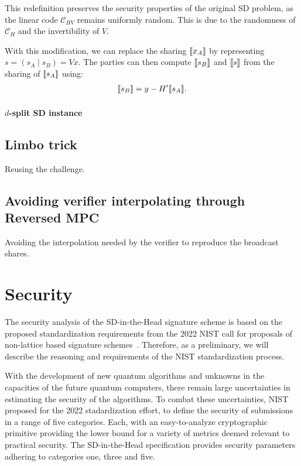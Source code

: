 \documentclass[11pt]{report}
\theoremstyle{definition}
\theoremstyle{plain}
\begin{document}
This redefinition preserves the security properties of the original SD problem, as the linear code $\mathcal{C}_{HV}$ remains uniformly random. This is due to the randomness of $\mathcal{C}_H$ and the invertibility of $V$.

With this modification, we can replace the sharing $\llbracket x_A \rrbracket$ by representing $s = (s_A \mid s_B) = Vx$. The parties can then compute $\llbracket s_B \rrbracket$ and $\llbracket s \rrbracket$ from the sharing of $\llbracket s_A \rrbracket$ using:
\begin{align*}
  \llbracket s_B \rrbracket = y - H'\llbracket s_A \rrbracket.
\end{align*}

\paragraph{$d$-split SD instance}

\subsection{Limbo trick}

Reusing the challenge.

\subsection{Avoiding verifier interpolating through Reversed MPC}

Avoiding the interpolation needed by the verifier to reproduce the broadcast shares.

\section{Security}

The security analysis of the SD-in-the-Head signature scheme is based on the proposed standardization requirements from the 2022 NIST call for proposals of non-lattice based signature schemes~\cite{nistcall}. Therefore, as a preliminary, we will describe the reasoning and requirements of the NIST standardization process.

With the development of new quantum algorithms and unknowns in the capacities of the future quantum computers, there remain large uncertainties in estimating the security of the algorithms. To combat these uncertainties, NIST proposed for the 2022 stadardization effort, to define the security of submissions in a range of five categories. Each, with an easy-to-analyze cryptographic primitive providing the lower bound for a variety of metrics deemed relevant to practical security. The SD-in-the-Head specification provides security parameters adhering to categories one, three and five.
\end{document}
